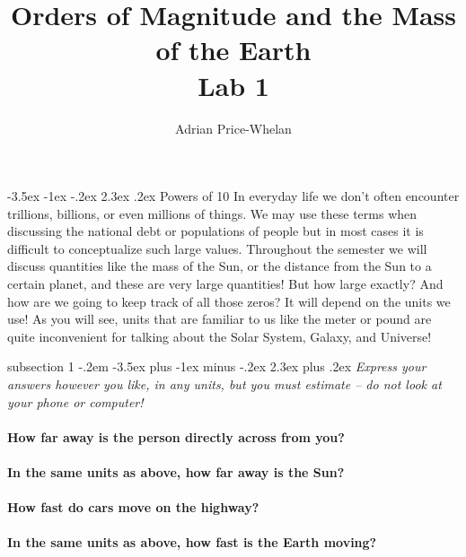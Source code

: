 \documentclass[12pt]{article}
\makeatletter
\newenvironment{problem}{\@startsection
       {subsection}
       {1}
       {-.2em}
       {-3.5ex plus -1ex minus -.2ex}
       {2.3ex plus .2ex}
       {\pagebreak[3]%
       \normalsize\bf\noindent{Problem }
       }
       }
       {%
       }
\renewcommand\section{\@startsection{section}{1}{\z@}%
                                  {-3.5ex \@plus -1ex \@minus -.2ex}%
                                  {2.3ex \@plus.2ex}%
                                  {\normalfont\large\bfseries}}
\makeatother
\begin{document}
\title{Orders of Magnitude and the Mass of the Earth \\ \large \textbf{Lab 1}}
\author{Adrian Price-Whelan}
\date{}%

\maketitle

\thispagestyle{empty}

\section{Powers of 10}
\indent\indent In everyday life we don't often encounter trillions, billions, or even millions of things. We may use these terms when discussing the national debt or populations of people but in most cases it is difficult to conceptualize such large values. Throughout the semester we will discuss quantities like the mass of the Sun, or the distance from the Sun to a certain planet, and these are very large quantities! But how large exactly? And how are we going to keep track of all those zeros? It will depend on the units we use! As you will see, units that are familiar to us like the meter or pound are quite inconvenient for talking about the Solar System, Galaxy, and Universe!


\begin{problem}{ }
	\textit{Express your answers however you like, in any units, but you must estimate -- do not look at your phone or computer!}  \\ \\
	\textbf{How far away is the person directly across from you?} \hrulefill \\ \\
	\textbf{In the same units as above, how far away is the Sun?} \hrulefill \\ \\
	\textbf{How fast do cars move on the highway?} \hrulefill \\ \\
	\textbf{In the same units as above, how fast is the Earth moving?} \hrulefill 
\end{problem}
\end{document}
